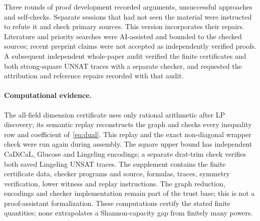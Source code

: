 Three rounds of proof development recorded arguments, unsuccessful approaches and self-checks.
Separate sessions that had not seen the material were instructed to
refute it and check primary sources. This version incorporates their
repairs. Literature and priority searches were AI-assisted and bounded
to the checked sources; recent preprint claims were not accepted as
independently verified proofs.
A subsequent independent whole-paper audit verified the finite certificates
and both strong-square UNSAT traces with a separate checker, and requested
the attribution and reference repairs recorded with that audit.

\paragraph{Computational evidence.}
The all-field dimension certificate uses only rational arithmetic after
LP discovery; its semantic replay reconstructs the graph and checks
every inequality row and coefficient of~\eqref{eq:dual}. This replay
and the exact non-diagonal wrapper check were run again during assembly.
The square upper bound has independent CaDiCaL, Glucose and Lingeling
encodings; a separate drat-trim check verifies both saved Lingeling
UNSAT traces. The supplement contains the finite certificate data,
checker programs and source, formulas, traces, symmetry verification,
lower witness and replay instructions. The graph reduction, encodings
and checker implementation remain part of the trust base; this is not
a proof-assistant formalization. These
computations certify the stated finite quantities; none extrapolates a
Shannon-capacity gap from finitely many powers.
